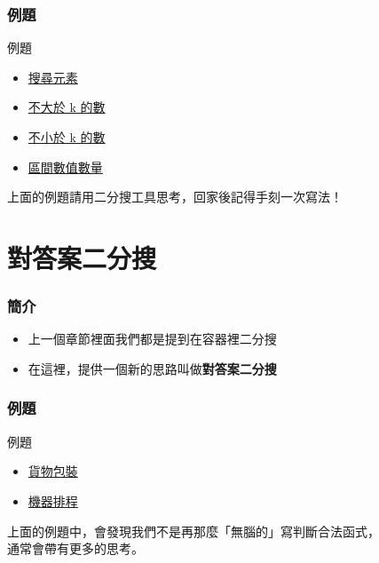 \documentclass[mathserif]{beamer}
\begin{document}
\begin{frame}
    \frametitle{例題}
    \begin{block}{例題}
        \begin{itemize}
            \item \href{https://codeforces.com/edu/course/2/lesson/6/1/practice/contest/283911/problem/A}{搜尋元素}
            \item \href{https://codeforces.com/edu/course/2/lesson/6/1/practice/contest/283911/problem/B}{不大於 k 的數}
            \item \href{https://codeforces.com/edu/course/2/lesson/6/1/practice/contest/283911/problem/C}{不小於 k 的數}
            \item \href{https://codeforces.com/edu/course/2/lesson/6/1/practice/contest/283911/problem/D}{區間數值數量}
        \end{itemize}

        上面的例題請用二分搜工具思考，回家後記得手刻一次寫法！
    \end{block}
\end{frame}

\section{對答案二分搜}

\begin{frame}
    \frametitle{簡介}
    \begin{itemize}
        \item 上一個章節裡面我們都是提到在容器裡二分搜
        \item 在這裡，提供一個新的思路叫做\textbf{對答案二分搜}
    \end{itemize}
\end{frame}

\begin{frame}
    \frametitle{例題}
    \begin{block}{例題}
        \begin{itemize}
            \item \href{https://codeforces.com/edu/course/2/lesson/6/2/practice/contest/283932/problem/A}{貨物包裝}
            \item \href{https://cses.fi/problemset/task/1620}{機器排程}
        \end{itemize}

        上面的例題中，會發現我們不是再那麼「無腦的」寫判斷合法函式，\\
        通常會帶有更多的思考。
    \end{block}
\end{frame}
\end{document}
